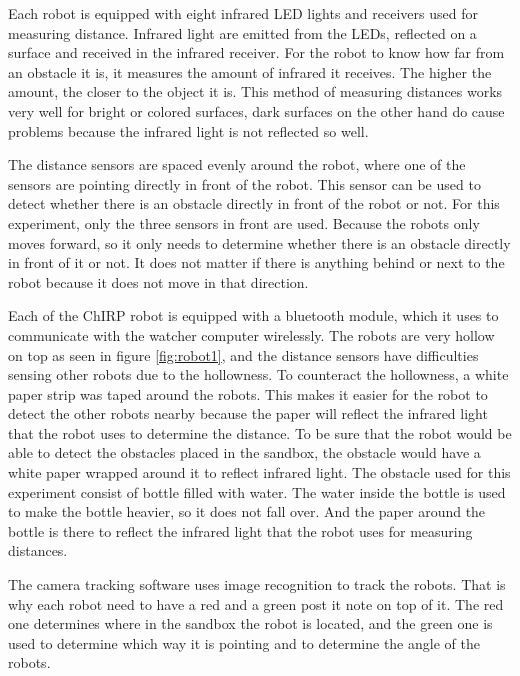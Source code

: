 Each robot is equipped with eight infrared LED lights and receivers used for measuring distance. Infrared light are emitted from the LEDs, reflected on a surface and received in the infrared receiver. For the robot to know how far from an obstacle it is, it measures the amount of infrared it receives. The higher the amount, the closer to the object it is. This method of measuring distances works very well for bright or colored surfaces, dark surfaces on the other hand do cause problems because the infrared light is not reflected so well.

The distance sensors are spaced evenly around the robot, where one of the sensors are pointing directly in front of the robot. This sensor can be used to detect whether there is an obstacle directly in front of the robot or not. For this experiment, only the three sensors in front are used. Because the robots only moves forward, so it only needs to determine whether there is an obstacle directly in front of it or not. It does not matter if there is anything behind or next to the robot because it does not move in that direction.

Each of the ChIRP robot is equipped with a bluetooth module, which it uses to communicate with the watcher computer wirelessly. 
The robots are very hollow on top as seen in figure \ref{fig:robot1}, and the distance sensors have difficulties sensing other robots due to the hollowness. To counteract the hollowness, a white paper strip was taped around the robots. This makes it easier for the robot to detect the other robots nearby because the paper will reflect the infrared light that the robot uses to determine the distance. To be sure that the robot would be able to detect the obstacles placed in the sandbox, the obstacle would have a white paper wrapped around it to reflect infrared light. The obstacle used for this experiment consist of bottle filled with water. The water inside the bottle is used to make the bottle heavier, so it does not fall over. And the paper around the bottle is there to reflect the infrared light that the robot uses for measuring distances.

The camera tracking software uses image recognition to track the robots. That is why each robot need to have a red and a green post it note on top of it. The red one determines where in the sandbox the robot is located, and the green one is used to determine which way it is pointing and to determine the angle of the robots.

